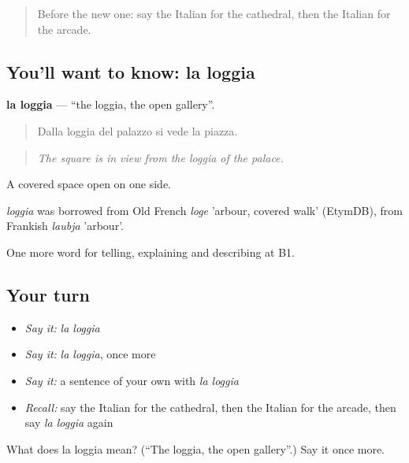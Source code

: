 \label{lesson:IT-C445-loggia}



\begin{quote}
Before the new one: say the Italian for the cathedral, then the Italian for the arcade.
\end{quote}

\subsection*{You'll want to know: la loggia}
\textbf{la loggia} — \textquotedblleft{}the loggia, the open gallery\textquotedblright{}.

\begin{quote}
Dalla loggia del palazzo si vede la piazza.
\end{quote}

\begin{quote}
\emph{The square is in view from the loggia of the palace.}
\end{quote}

A covered space open on one side.

\begin{cousinweb}
\emph{loggia} was borrowed from Old French \emph{loge} 'arbour, covered walk' (EtymDB), from Frankish \emph{laubja} 'arbour'.
\end{cousinweb}

\begin{grammarlens}[title={What you've built}]
One more word for telling, explaining and describing at B1.
\end{grammarlens}

\subsection*{Your turn}
\begin{itemize}
\raggedright
  \item \emph{Say it:} \emph{la loggia}
  \item \emph{Say it:} \emph{la loggia}, once more
  \item \emph{Say it:} a sentence of your own with \emph{la loggia}
  \item \emph{Recall:} say the Italian for the cathedral, then the Italian for the arcade, then say \emph{la loggia} again
\end{itemize}

\begin{tcolorbox}[breakable,colback=teal!4,colframe=teal!35!black,title={Before you move on}]
What does la loggia mean? (\textquotedblleft{}The loggia, the open gallery\textquotedblright{}.) Say it once more.
\end{tcolorbox}

